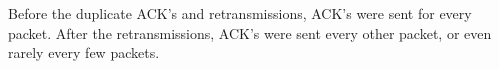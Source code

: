 Before the duplicate ACK's and retransmissions, ACK's were sent for every packet. After the retransmissions, ACK's were sent every other packet, or even rarely every few packets.